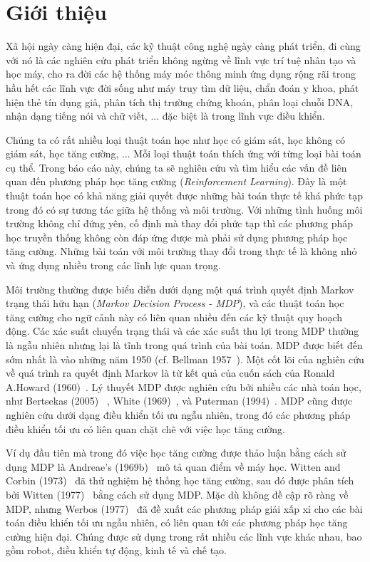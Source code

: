 \chapter{Giới thiệu}
\label{ch:intro}
	Xã hội ngày càng hiện đại, các kỹ thuật công nghệ ngày càng phát triển, đi cùng với nó là các nghiên cứu phát triển không ngừng về lĩnh vực trí tuệ nhân tạo và học máy, cho ra đời các hệ thống máy móc thông minh ứng dụng rộng rãi trong hầu hết các lĩnh vực đời sống như máy truy tìm dữ liệu, chẩn đoán y khoa, phát hiện thẻ tín dụng giả, phân tích thị trường chứng khoán, phân loại chuỗi DNA, nhận dạng tiếng nói và chữ viết, ... đặc biệt là trong lĩnh vực điều khiển.
	
	Chúng ta có rất nhiều loại thuật toán học như học có giám sát, học không có giám sát, học tăng cường, ... Mỗi loại thuật toán thích ứng với từng loại bài toán cụ thể. Trong báo cáo này, chúng ta sẽ nghiên cứu và tìm hiểu các vấn đề liên quan đến phương pháp học tăng cường (\textit{Reinforcement Learning}). Đây là một thuật toán học có khả năng giải quyết được những bài toán thực tế khá phức tạp trong đó có sự tương tác giữa hệ thống và môi trường. Với những tình huống môi trường không chỉ đứng yên, cố định mà thay đổi phức tạp thì các phương pháp học truyền thống không còn đáp ứng được mà phải sử dụng phương pháp học tăng cường. Những bài toán với môi trường thay đổi trong thực tế là không nhỏ và ứng dụng nhiều trong các lĩnh lực quan trọng.
	
	Môi trường thường được biểu diễn dưới dạng một quá trình quyết định Markov trạng thái hữu hạn (\textit{Markov Decision Process - MDP}), và các thuật toán học tăng cường cho ngữ cảnh này có liên quan nhiều đến các kỹ thuật quy hoạch động. Các xác suất chuyển trạng thái và các xác suất thu lợi trong MDP thường là ngẫu nhiên nhưng lại là tĩnh trong quá trình của bài toán. MDP được biết đến sớm nhất là vào những năm 1950 (cf. Bellman 1957~\cite{Belman1957}). Một cốt lõi của nghiên cứu về quá trình ra quyết định Markov là từ kết quả của cuốn sách của Ronald A.Howard (1960)~\cite{Howard1960}. Lý thuyết MDP được nghiên cứu bởi nhiều các nhà toán học, như  Bertsekas (2005)~\cite{Bertsekas2005} , White (1969)~\cite{White1969}, và Puterman (1994)~\cite{Puterman1994}. MDP cũng được nghiên cứu dưới dạng điều khiển tối ưu ngẫu nhiên, trong đó các phương pháp điều khiển tối ưu  có liên quan chặt chẽ với việc học tăng cường.
	
		Ví dụ đầu tiên mà  trong đó việc học tăng cường được thảo luận bằng cách sử dụng  MDP là Andreae’s (1969b)~\cite{Andreae1969b} mô tả  quan điểm về máy học. Witten and Corbin (1973)~\cite{Witten1973} đã thử nghiệm hệ thống học tăng cường, sau đó được phân tích bởi Witten (1977)~\cite{Witten1977} bằng cách sử dụng MDP. Mặc dù không đề cập rõ ràng về MDP, nhưng Werbos (1977)~\cite{Werbos1977} đã đề xuất các phương pháp giải xấp xỉ cho các bài toán điều khiển tối ưu ngẫu nhiên, có liên quan tới các phương pháp học tăng cường hiện đại. Chúng được sử dụng trong rất nhiều các lĩnh vực khác nhau, bao gồm robot, điều khiển tự động, kinh tế và chế tạo.\\
	
